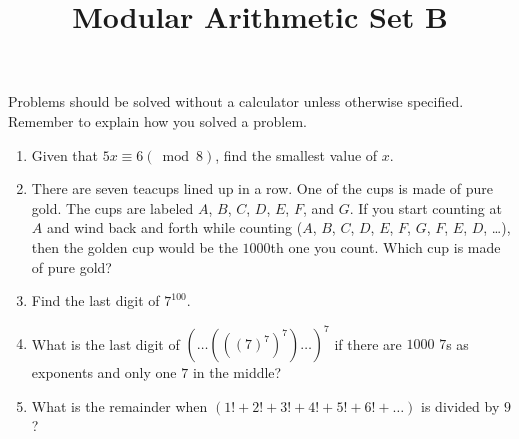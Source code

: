 \documentclass{article}
\title{Modular Arithmetic Set B}
\date{}
\author{}
\begin{document}
\maketitle
\noindent Problems should be solved without a calculator unless otherwise specified.
Remember to explain how you solved a problem.
\begin{multicols}{2}
    \raggedcolumns
    \begin{enumerate}
        \item Given that $5x \equiv 6 (\bmod 8)$, find the smallest value of $x$.
            \vspace{3cm}
        \item There are seven teacups lined up in a row.
            One of the cups is made of pure gold.
            The cups are labeled $A$, $B$, $C$, $D$, $E$, $F$, and $G$.
            If you start counting at $A$ and wind back and forth while counting ($A$, $B$, $C$, $D$, $E$, $F$, $G$, $F$, $E$, $D$, \dots), then the golden cup would be the $1000$th one you count.
            Which cup is made of pure gold?
            \vspace{3cm}
        \item Find the last digit of $7^{100}$.
            \vspace{3cm}
        \item What is the last digit of $(\dots(((7)^7)^7)\dots)^7$ if there are $1000$ $7$s as exponents and only one $7$ in the middle?
            \vspace{3cm}
        \item What is the remainder when $(1! + 2! + 3! + 4! + 5! + 6! + \dots)$ is divided by $9$?
            \vspace{3cm}
    \end{enumerate}
\end{multicols}
\end{document}
